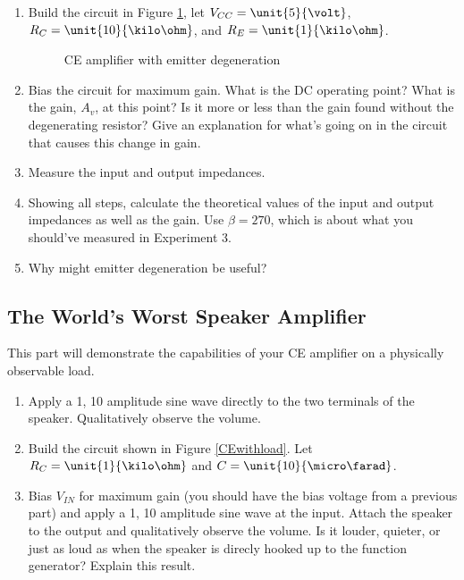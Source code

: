\documentclass{article}
\begin{document}
\begin{enumerate}

\item Build the circuit in Figure \ref{degen}, let $V_{CC} = \unit{5}{\volt}$, $R_{C} = \unit{10}{\kilo\ohm}$, and $R_{E} = \unit{1}{\kilo\ohm}$.
	\begin{figure}[!htb]
		
		\centerline{\box\graph}
		\caption{CE amplifier with emitter degeneration}
		\label{degen}
	\end{figure}
\item Bias the circuit for maximum gain. What is the DC operating point? What is the gain, $A_{v}$, at this point? Is it more or less than the gain found without the degenerating resistor? Give an explanation for what's going on in the circuit that causes this change in gain.
\item Measure the input and output impedances.
\item Showing all steps, calculate the theoretical values of the input and output impedances as well as the gain. Use $\beta = 270$, which is about what you should've measured in Experiment 3.
\item Why might emitter degeneration be useful?

\end{enumerate}

\subsection{The World's Worst Speaker Amplifier}
This part will demonstrate the capabilities of your CE amplifier on a physically observable load. 
\begin{enumerate}
\item Apply a \unit{1}{\kilo\hertz}, \unit{10}{\milli\volt} amplitude sine wave directly to the two terminals of the speaker. Qualitatively observe the volume.
\item Build the circuit shown in Figure \ref{CEwithload}. Let $R_C = \unit{1}{\kilo\ohm}$ and $C = \unit{10}{\micro\farad}$.
\item Bias $V_{IN}$ for maximum gain (you should have the bias voltage from a previous part) and apply a \unit{1}{\kilo\hertz}, \unit{10}{\milli\volt} amplitude sine wave at the input. Attach the speaker to the output and qualitatively observe the volume. Is it louder, quieter, or just as loud as when the speaker is direcly hooked up to the function generator? Explain this result.


\end{enumerate}
\end{document}

